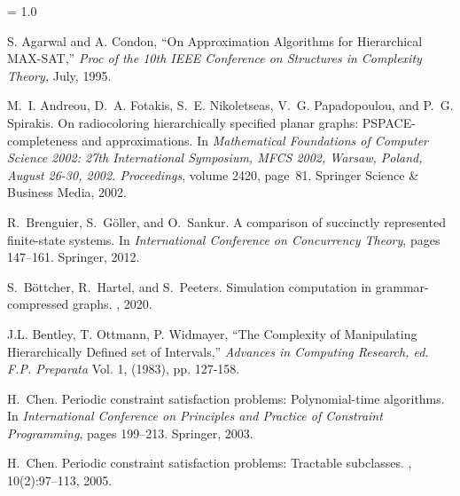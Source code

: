 
\baselineskip = 1.0\normalbaselineskip
\begin{thebibliography}{HMRR93}

 S. Agarwal and  A. Condon, 
``On Approximation Algorithms for Hierarchical MAX-SAT,''
{\em Proc of the 10th IEEE Conference on Structures in Complexity Theory,} 
July, 1995.




M.~I. Andreou, D.~A. Fotakis, S.~E. Nikoletseas, V.~G. Papadopoulou, and P.~G.
  Spirakis.
\newblock On radiocoloring hierarchically specified planar graphs:
  {PSPACE}-completeness and approximations.
\newblock In {\em Mathematical Foundations of Computer Science 2002: 27th
  International Symposium, MFCS 2002, Warsaw, Poland, August 26-30, 2002.
  Proceedings}, volume 2420, page~81. Springer Science \& Business Media, 2002.

R.~Brenguier, S.~G{\"o}ller, and O.~Sankur.
\newblock A comparison of succinctly represented finite-state systems.
\newblock In {\em International Conference on Concurrency Theory}, pages
  147--161. Springer, 2012.

S.~B{\"o}ttcher, R.~Hartel, and S.~Peeters.
\newblock Simulation computation in grammar-compressed graphs.
, 2020.

 J.L. Bentley, T. Ottmann, P. Widmayer,
``The Complexity of Manipulating Hierarchically Defined set of Intervals,''
{\em Advances in Computing Research, ed.  F.P. Preparata} 
Vol. 1, (1983), pp. 127-158.


H.~Chen.
\newblock Periodic constraint satisfaction problems: Polynomial-time
  algorithms.
\newblock In {\em International Conference on Principles and Practice of
  Constraint Programming}, pages 199--213. Springer, 2003.

H.~Chen.
\newblock Periodic constraint satisfaction problems: Tractable subclasses.
, 10(2):97--113, 2005.



\end{thebibliography}
